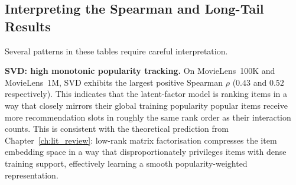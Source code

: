 \documentclass[11pt,a4paper]{report}
\begin{document}
\begin{table}[htbp]
  \centering
  \caption{Aggregate diversity (count of unique items recommended across all test users) and long-tail share LT$_{20}$ (fraction of recommendation slots drawn from the least popular 20\% of training items). Higher aggregate diversity and higher LT$_{20}$ both indicate less popularity concentration.}
  \label{tab:macro-aggregate}
\end{table}

\subsection*{Interpreting the Spearman and Long-Tail Results}

Several patterns in these tables require careful interpretation.

\textbf{SVD: high monotonic popularity tracking.} On MovieLens~100K and MovieLens~1M, SVD exhibits the largest positive Spearman $\rho$ ($0.43$ and $0.52$ respectively). This indicates that the latent-factor model is ranking items in a way that closely mirrors their global training popularity popular items receive more recommendation slots in roughly the same rank order as their interaction counts. This is consistent with the theoretical prediction from Chapter~\ref{ch:lit_review}: low-rank matrix factorisation compresses the item embedding space in a way that disproportionately privileges items with dense training support, effectively learning a smooth popularity-weighted representation.
\end{document}
